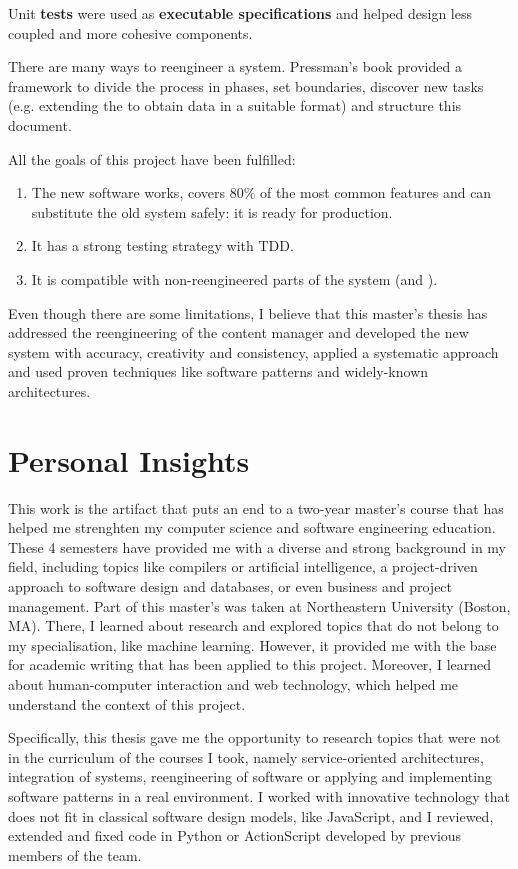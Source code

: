 Unit \textbf{tests} were used as \textbf{executable specifications} and helped design less coupled and more cohesive components.

There are many ways to reengineer a system.
Pressman's book provided a framework to divide the process in phases, set boundaries, discover new tasks (e.g. extending the \flangobe to obtain data in a suitable format) and structure this document.

All the goals of this project have been fulfilled:
\begin{enumerate}
\item The new software works, covers 80\% of the most common features and can substitute the old \flash system safely: it is ready for production.
\item It has a strong testing strategy with \ac{TDD}.
\item It is compatible with non-reengineered parts of the system (\flangobe and \flangofe).
\end{enumerate}

Even though there are some limitations, I believe that this master's thesis has addressed the reengineering of the content manager and developed the new system with accuracy, creativity and consistency, applied a systematic approach and used proven techniques like software patterns and widely-known architectures.


\section{Personal Insights}
This work is the artifact that puts an end to a two-year master's course that has helped me strenghten my computer science and software engineering education.
These 4 semesters have provided me with a diverse and strong background in my field, including topics like compilers or artificial intelligence, a project-driven approach to software design and databases, or even business and project management.
Part of this master's was taken at Northeastern University (Boston, MA).
There, I learned about research and explored topics that do not belong to my specialisation, like machine learning.
However, it provided me with the base for academic writing that has been applied to this project.
Moreover, I learned about human-computer interaction and web technology, which helped me understand the context of this project.

Specifically, this thesis gave me the opportunity to research topics that were not in the curriculum of the courses I took, namely service-oriented architectures, integration of systems, reengineering of software or applying and implementing software patterns in a real environment.
I worked with innovative technology that does not fit in classical software design models, like JavaScript, and I reviewed, extended and fixed code in Python or ActionScript developed by previous members of the team.

